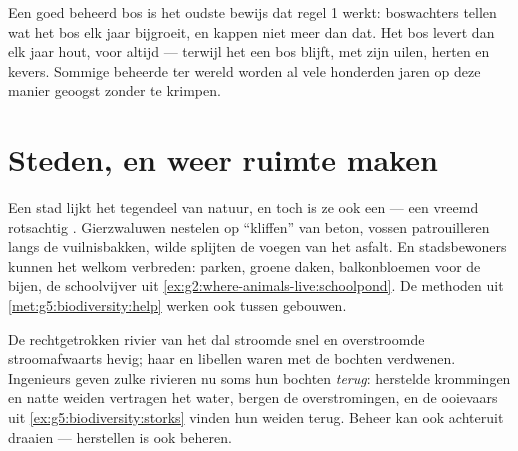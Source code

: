 \begin{example}\label{ex:g5:people-and-nature:forester}
Een goed beheerd bos is het oudste bewijs dat regel 1 werkt:
boswachters tellen wat het bos elk jaar bijgroeit, en kappen niet meer
dan dat. Het bos levert dan elk jaar hout, voor altijd --- terwijl het
een bos blijft, met zijn uilen, herten en kevers. Sommige beheerde
 ter wereld worden al vele honderden jaren op deze manier geoogst
zonder te krimpen.
\end{example}

\section{Steden, en weer ruimte maken}

\begin{example}\label{ex:g5:people-and-nature:city}
Een stad lijkt het tegendeel van natuur, en toch is ze ook een
 --- een vreemd rotsachtig . Gierzwaluwen nestelen
op ``kliffen'' van beton, vossen patrouilleren langs de vuilnisbakken,
wilde  splijten de voegen van het asfalt. En stadsbewoners kunnen
het welkom verbreden: parken, groene daken, balkonbloemen voor de bijen,
de schoolvijver uit \cref{ex:g2:where-animals-live:schoolpond}. De
methoden uit \cref{met:g5:biodiversity:help} werken ook tussen gebouwen.
\end{example}

\begin{example}\label{ex:g5:people-and-nature:river}
De rechtgetrokken rivier van het dal stroomde snel en overstroomde
stroomafwaarts hevig; haar  en libellen waren met de bochten
verdwenen. Ingenieurs geven zulke rivieren nu soms hun bochten
\emph{terug}: herstelde krommingen en natte weiden vertragen het water,
bergen de overstromingen, en de ooievaars uit
\cref{ex:g5:biodiversity:storks} vinden hun weiden terug. Beheer kan ook
achteruit draaien --- herstellen is ook beheren.
\end{example}

